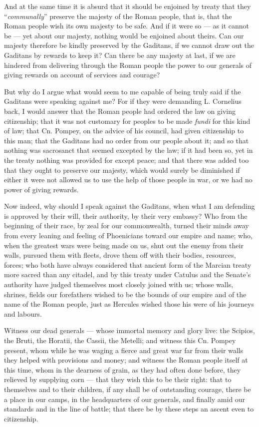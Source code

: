  And at the same time it is absurd that it should be enjoined by treaty that they ``\textit{communally}'' preserve the majesty of the Roman people, that is, that the Roman people wish its own majesty to be safe. And if it were so --- as it cannot be --- yet about our majesty, nothing would be enjoined about theirs. Can our majesty therefore be kindly preserved by the Gaditans, if we cannot draw out the Gaditans by rewards to keep it? Can there be any majesty at last, if we are hindered from delivering through the Roman people the power to our generals of giving rewards on account of services and courage?

 But why do I argue what would seem to me capable of being truly said if the Gaditans were speaking against me? For if they were demanding L. Cornelius back, I would answer that the Roman people had ordered the law on giving citizenship; that it was not customary for peoples to be made \textit{fundi} for this kind of law; that Cn. Pompey, on the advice of his council, had given citizenship to this man; that the Gaditans had no order from our people about it; and so that nothing was sacrosanct that seemed excepted by the law; if it had been so, yet in the treaty nothing was provided for except peace; and that there was added too that they ought to preserve our majesty, which would surely be diminished if either it were not allowed us to use the help of those people in war, or we had no power of giving rewards.

 Now indeed, why should I speak against the Gaditans, when what I am defending is approved by their will, their authority, by their very embassy? Who from the beginning of their race, by zeal for our commonwealth, turned their minds away from every leaning and feeling of Phoenicians toward our empire and name; who, when the greatest wars were being made on us, shut out the enemy from their walls, pursued them with fleets, drove them off with their bodies, resources, forces; who both have always considered that ancient form of the Marcian treaty more sacred than any citadel, and by this treaty under Catulus and the Senate's authority have judged themselves most closely joined with us; whose walls, shrines, fields our forefathers wished to be the bounds of our empire and of the name of the Roman people, just as Hercules wished those his were of his journeys and labours.

 Witness our dead generals --- whose immortal memory and glory live: the Scipios, the Bruti, the Horatii, the Cassii, the Metelli; and witness this Cn. Pompey present, whom while he was waging a fierce and great war far from their walls they helped with provisions and money; and witness the Roman people itself at this time, whom in the dearness of grain, as they had often done before, they relieved by supplying corn --- that they wish this to be their right: that to themselves and to their children, if any shall be of outstanding courage, there be a place in our camps, in the headquarters of our generals, and finally amid our standards and in the line of battle; that there be by these steps an ascent even to citizenship.

